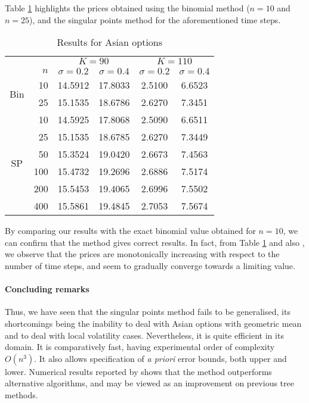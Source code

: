 Table \ref{tab:asian-results} highlights the prices obtained using the binomial method ($ n = 10 $ and $ n = 25 $), and the singular points method for the aforementioned time steps.
\begin{table}[h]
	\centering
	\caption{Results for Asian options}
	\label{tab:asian-results}
	\begin{tabular}{crcccc}
		\toprule
		&         &  \multicolumn{2}{c}{$ K = 90 $}  &  \multicolumn{2}{c}{$ K = 110 $}  \\
		       \cmidrule(lr){3-4}\cmidrule(lr){5-6}
		&  $ n $  &  $ \sigma = 0.2 $  &  $ \sigma = 0.4 $  &  $ \sigma = 0.2 $  &  $ \sigma = 0.4 $  \\
		\midrule
		\multirow{2}{2em}{Bin}
		&   10  &  14.5912  &  17.8033  &  2.5100  &  6.6523  \\
		&   25  &  15.1535  &  18.6786  &  2.6270  &  7.3451  \\
		\midrule
		\multirow{6}{2em}{SP}
		&   10  &  14.5925  &  17.8068  &  2.5090  &  6.6511  \\
		&   25  &  15.1535  &  18.6785  &  2.6270  &  7.3449  \\
		&   50  &  15.3524  &  19.0420  &  2.6673  &  7.4563  \\
		&  100  &  15.4732  &  19.2696  &  2.6886  &  7.5174  \\
		&  200  &  15.5453  &  19.4065  &  2.6996  &  7.5502  \\
		&  400  &  15.5861  &  19.4845  &  2.7053  &  7.5674  \\
		\midrule
		\bottomrule
	\end{tabular}
\end{table}


By comparing our results with the exact binomial value obtained for $ n = 10 $, we can confirm that the method gives correct results. In fact, from Table \ref{tab:asian-results} and also \cite[Tables 1 -- 2 and 4 -- 7]{Gaudenzi2010}, we observe that the prices are monotonically increasing with respect to the number of time steps, and seem to gradually converge towards a limiting value.


\paragraph{Concluding remarks}
Thus, we have seen that the singular points method fails to be generalised, its shortcomings being the inability to deal with Asian options with geometric mean and to deal with local volatility cases. Nevertheless, it is quite efficient in its domain. It is comparatively fast, having experimental order of complexity $ O(n^3) $. It also allows specification of \emph{a priori} error bounds, both upper and lower. Numerical results reported by \cite{Gaudenzi2010} shows that the method outperforms alternative algorithms, and may be viewed as an improvement on previous tree methods.


